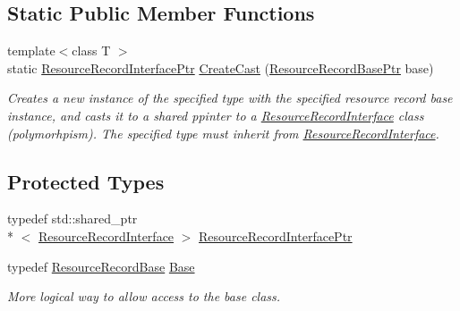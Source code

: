 \subsection*{Static Public Member Functions}
\begin{DoxyCompactItemize}
\item 
{\footnotesize template$<$class T $>$ }\\static \hyperlink{class_senergy_1_1_dns_1_1_resource_record_interface_abf5eec20c95f05b57c5c02eaed349e16}{Resource\-Record\-Interface\-Ptr} \hyperlink{class_senergy_1_1_dns_1_1_resource_record_interface_a342b71b9977f20ecb1dc7b3fd6ae0751}{Create\-Cast} (\hyperlink{namespace_senergy_1_1_dns_a72915c893fbf242018e79d8f92e1646b}{Resource\-Record\-Base\-Ptr} base)
\begin{DoxyCompactList}\small\item\em Creates a new instance of the specified type with the specified resource record base instance, and casts it to a shared ppinter to a \hyperlink{class_senergy_1_1_dns_1_1_resource_record_interface}{Resource\-Record\-Interface} class (polymorhpism). The specified type must inherit from \hyperlink{class_senergy_1_1_dns_1_1_resource_record_interface}{Resource\-Record\-Interface}. \end{DoxyCompactList}\end{DoxyCompactItemize}
\subsection*{Protected Types}
\begin{DoxyCompactItemize}
\item 
typedef std\-::shared\-\_\-ptr\\*
$<$ \hyperlink{class_senergy_1_1_dns_1_1_resource_record_interface}{Resource\-Record\-Interface} $>$ \hyperlink{class_senergy_1_1_dns_1_1_resource_record_interface_abf5eec20c95f05b57c5c02eaed349e16}{Resource\-Record\-Interface\-Ptr}
\item 
typedef \hyperlink{class_senergy_1_1_dns_1_1_resource_record_base}{Resource\-Record\-Base} \hyperlink{class_senergy_1_1_dns_1_1_resource_record_interface_a59bcfc62cfc3a68464245b13ad3785e6}{Base}
\begin{DoxyCompactList}\small\item\em More logical way to allow access to the base class. \end{DoxyCompactList}\end{DoxyCompactItemize}

